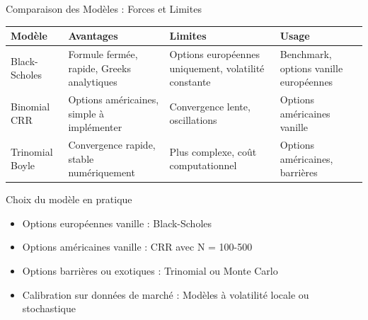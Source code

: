 \documentclass[aspectratio=169, 10pt]{beamer}
\begin{document}
\begin{frame}{Comparaison des Modèles : Forces et Limites}
    \begin{center}
    \small
    \begin{tabular}{p{2.5cm}p{3cm}p{3cm}p{3cm}}
        \toprule
        \textbf{Modèle} & \textbf{Avantages} & \textbf{Limites} & \textbf{Usage} \\
        \midrule
        Black-Scholes & Formule fermée, rapide, Greeks analytiques & Options européennes uniquement, volatilité constante & Benchmark, options vanille européennes \\
        \addlinespace
        Binomial CRR & Options américaines, simple à implémenter & Convergence lente, oscillations & Options américaines vanille \\
        \addlinespace
        Trinomial Boyle & Convergence rapide, stable numériquement & Plus complexe, coût computationnel & Options américaines, barrières \\
        \bottomrule
    \end{tabular}
    \end{center}
    
    \vspace{0.3cm}
    \begin{block}{Choix du modèle en pratique}
    \begin{itemize}
        \item Options européennes vanille : Black-Scholes
        \item Options américaines vanille : CRR avec N = 100-500
        \item Options barrières ou exotiques : Trinomial ou Monte Carlo
        \item Calibration sur données de marché : Modèles à volatilité locale ou stochastique
    \end{itemize}
    \end{block}
\end{frame}
\end{document}
